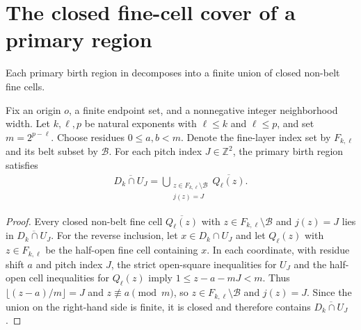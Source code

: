 \section{The closed fine-cell cover of a primary region}
\label{sec:area_law_primary_fine_cell_cover}

Each primary birth region in \cite[Section~11]{OpenAI2026AreaLaw} decomposes
into a finite union of closed non-belt fine cells.


\begin{lemma}
    \label{thm:area_law_primary_fine_cell_cover}
    \leanok
    Fix an origin $o$, a finite endpoint set, and a nonnegative integer
    neighborhood width. Let $k,\ell,p$ be natural exponents with
    $\ell\le k$ and $\ell\le p$, and set $m=2^{p-\ell}$. Choose
    residues $0\le a,b<m$. Denote the fine-layer index set by
    $F_{k,\ell}$ and its belt subset by $\mathcal B$.
    For each pitch index $J\in\mathbb Z^2$, the primary birth region
    satisfies
    \begin{align}
        \overline{D_k\cap U_J}
        =\bigcup_{\substack{z\in F_{k,\ell}\setminus\mathcal B \\j(z)=J}}
        \overline{Q_\ell(z)}.
    \end{align}
\end{lemma}
\begin{proof}\leanok
    Every closed non-belt fine cell $\overline{Q_\ell(z)}$ with
    $z\in F_{k,\ell}\setminus\mathcal B$ and $j(z)=J$ lies in
    $\overline{D_k\cap U_J}$. For the reverse inclusion,
    let $x\in D_k\cap U_J$ and let $Q_\ell(z)$ with $z\in F_{k,\ell}$ be the
    half-open fine cell containing $x$. In each coordinate, with residue shift
    $a$ and pitch index $J$, the strict open-square inequalities for $U_J$ and
    the half-open cell inequalities for $Q_\ell(z)$ imply $1\le z-a-mJ<m$.
    Thus $\lfloor(z-a)/m\rfloor=J$ and $z\not\equiv a\pmod m$, so
    $z\in F_{k,\ell}\setminus\mathcal B$ and $j(z)=J$. Since the union on the
    right-hand side is finite, it is closed and therefore contains
    $\overline{D_k\cap U_J}$.
\end{proof}
